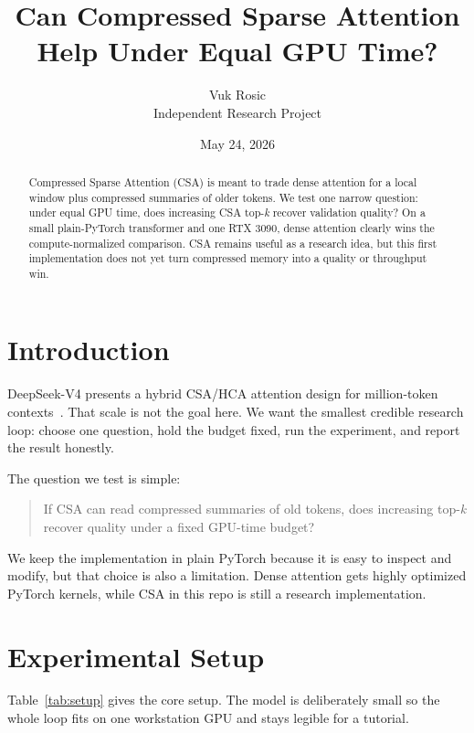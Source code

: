 \documentclass[10pt,twocolumn]{article}
\title{\vspace{-1.1em}\bfseries Can Compressed Sparse Attention Help Under Equal GPU Time?}
\author{Vuk Rosic\\\small Independent Research Project}
\date{May 24, 2026}
\begin{document}
\maketitle

\begin{abstract}
Compressed Sparse Attention (CSA) is meant to trade dense attention for a local
window plus compressed summaries of older tokens. We test one narrow question:
under equal GPU time, does increasing CSA top-\emph{k} recover validation
quality? On a small plain-PyTorch transformer and one RTX 3090, dense attention
clearly wins the compute-normalized comparison. CSA remains useful as a
research idea, but this first implementation does not yet turn compressed
memory into a quality or throughput win.
\end{abstract}

\section{Introduction}

DeepSeek-V4 presents a hybrid CSA/HCA attention design for million-token
contexts~\cite{deepseekv4}. That scale is not the goal here. We want the
smallest credible research loop: choose one question, hold the budget fixed,
run the experiment, and report the result honestly.

The question we test is simple:

\begin{quote}
If CSA can read compressed summaries of old tokens, does increasing top-\emph{k}
recover quality under a fixed GPU-time budget?
\end{quote}

We keep the implementation in plain PyTorch because it is easy to inspect and
modify, but that choice is also a limitation. Dense attention gets highly
optimized PyTorch kernels, while CSA in this repo is still a research
implementation.

\section{Experimental Setup}

Table~\ref{tab:setup} gives the core setup. The model is deliberately small so
the whole loop fits on one workstation GPU and stays legible for a tutorial.
\end{document}
